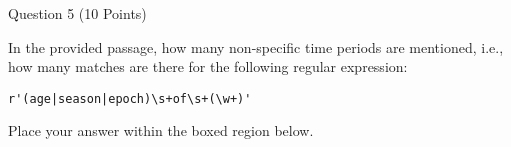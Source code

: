 \documentclass{article}
\begin{document}

\vspace{2cm}


\begin{minipage}{\textwidth}
    \noindent
    Question 5 (10 Points)
    \vspace{0.5cm}

    \noindent
    In the provided passage, how many non-specific time periods are mentioned,
    i.e., how many matches are there for the following regular expression:

    \vspace{0.5cm}

    \begin{lstlisting}
r'(age|season|epoch)\s+of\s+(\w+)'
    \end{lstlisting}

    \vspace{0.25cm}
    Place your answer within the boxed region below.
    \vspace{0.25cm}


\end{minipage}


\vspace{2cm}

\end{document}
